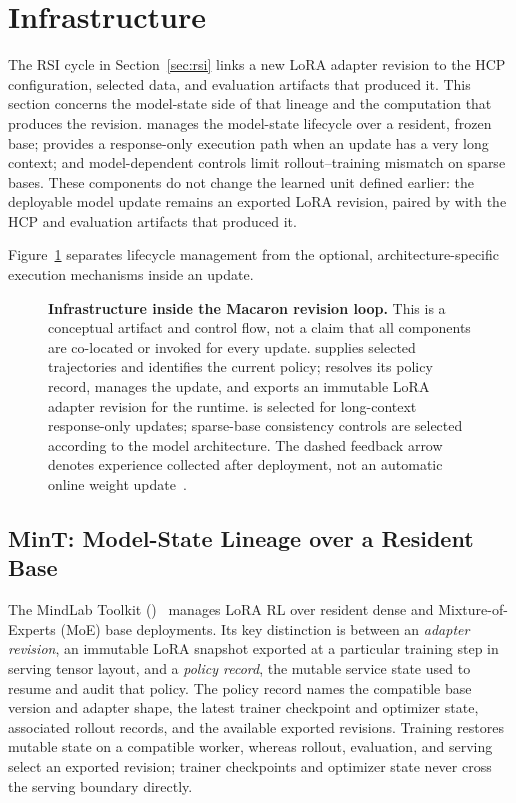 \section{Infrastructure}
\label{sec:infrastructure}

The RSI cycle in Section~\ref{sec:rsi} links a new LoRA adapter revision to the
HCP configuration, selected data, and evaluation artifacts that produced it.
This section concerns the model-state side of that lineage and the computation
that produces the revision. \mint{} manages the model-state
lifecycle over a resident, frozen base; \longstraw{} provides a response-only
execution path when an update has a very long context; and model-dependent
controls limit rollout--training mismatch on sparse bases. These components do
not change the learned unit defined earlier: the deployable model update remains
an exported LoRA revision, paired by \mindforge{} with the HCP and evaluation
artifacts that produced it.

Figure~\ref{fig:macaron-infra-loop} separates lifecycle management from the
optional, architecture-specific execution mechanisms inside an update.
\begin{figure}[h]
\centering
\resizebox{0.98\textwidth}{!}{}
\caption{\textbf{Infrastructure inside the Macaron revision loop.} This is a
conceptual artifact and control flow, not a claim that all components are
co-located or invoked for every update. \mindforge{} supplies selected
trajectories and identifies the current policy; \mint{} resolves its policy
record, manages the update, and exports an immutable LoRA adapter revision for
the \molshort{} runtime. \longstraw{} is
selected for long-context response-only updates; sparse-base consistency
controls are selected according to the model architecture. The dashed feedback
arrow denotes experience collected after deployment, not an automatic online
weight update~\citep{lu2026announcing,zhou2026longstrawlongcontextrl2m}.}
\label{fig:macaron-infra-loop}
\end{figure}
\FloatBarrier

\subsection{MinT: Model-State Lineage over a Resident Base}
\label{sec:infra_mint}

The MindLab Toolkit (\mint{})~\citep{lu2026announcing} manages LoRA RL over
resident dense and Mixture-of-Experts (MoE) base deployments. Its key
distinction is between an \emph{adapter revision}, an immutable LoRA snapshot
exported at a particular training step in serving tensor layout, and a
\emph{policy record}, the mutable service state used to resume and audit that
policy. The policy record names the compatible base version and adapter shape,
the latest trainer checkpoint and optimizer state, associated rollout records,
and the available exported revisions. Training restores mutable state on a
compatible worker, whereas rollout, evaluation, and serving select an exported
revision; trainer checkpoints and optimizer state never cross the serving
boundary directly.

